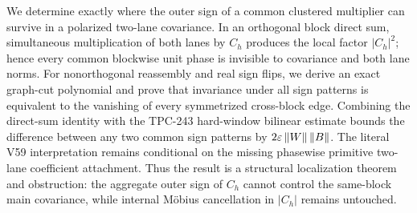We determine exactly where the outer sign of a common clustered multiplier can
survive in a polarized two-lane covariance.  In an orthogonal block direct sum,
simultaneous multiplication of both lanes by $C_h$ produces the local factor
$|C_h|^2$; hence every common blockwise unit phase is invisible to covariance
and both lane norms.  For nonorthogonal reassembly and real sign flips, we
derive an exact graph-cut polynomial and prove that invariance under all sign
patterns is equivalent to the vanishing of every symmetrized cross-block edge.
Combining the direct-sum identity with the TPC-243 hard-window bilinear estimate
bounds the difference between any two common sign patterns by
$2\varepsilon\left\lVert W\right\rVert\left\lVert B\right\rVert$.  The literal V59 interpretation remains conditional on
the missing phasewise primitive two-lane coefficient attachment.  Thus the
result is a structural localization theorem and obstruction: the aggregate
outer sign of $C_h$ cannot control the same-block main covariance, while
internal Möbius cancellation in $|C_h|$ remains untouched.
